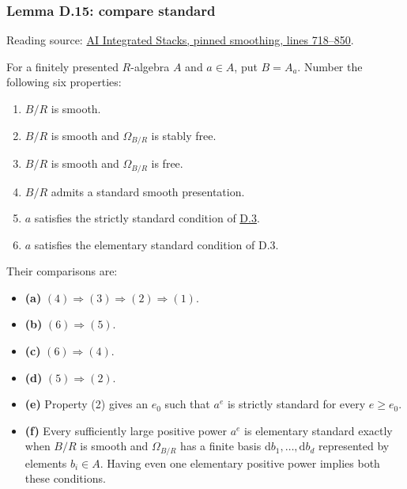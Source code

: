 \documentclass[11pt,a4paper,openany]{report}
\providecommand{\tightlist}{\setlength{\itemsep}{0pt}\setlength{\parskip}{0pt}}
\begin{document}
\label{AG-RG-S05-smoothing-lemma-compare-standard}

\subsubsection{Lemma D.15: compare standard}\label{AG-RG-S05-lemma-d.15-compare-standard}

Reading source: \href{https://github.com/KokunoYumeto/unofficial-stacks-project-ai-drafts/blob/565b10e987aba5969b21145a0833f42d69f96790/smoothing.tex\#L718-L850}{AI Integrated Stacks, pinned smoothing, lines 718--850}.

For a finitely presented \(R\)-algebra \(A\) and \(a\in A\), put \(B=A_a\). Number the following six properties:

\begin{enumerate}
\def\labelenumi{\arabic{enumi}.}
\tightlist
\item
  \(B/R\) is smooth.
\item
  \(B/R\) is smooth and \(\Omega_{B/R}\) is stably free.
\item
  \(B/R\) is smooth and \(\Omega_{B/R}\) is free.
\item
  \(B/R\) admits a standard smooth presentation.
\item
  \(a\) satisfies the strictly standard condition of \hyperref[AG-RG-S05-smoothing-definition-strictly-standard]{D.3}.
\item
  \(a\) satisfies the elementary standard condition of D.3.
\end{enumerate}

Their comparisons are:

\begin{itemize}
\tightlist
\item
  \textbf{(a)} \((4)\Rightarrow(3)\Rightarrow(2)\Rightarrow(1)\).
\item
  \textbf{(b)} \((6)\Rightarrow(5)\).
\item
  \textbf{(c)} \((6)\Rightarrow(4)\).
\item
  \textbf{(d)} \((5)\Rightarrow(2)\).
\item
  \textbf{(e)} Property (2) gives an \(e_0\) such that \(a^e\) is strictly standard for every \(e\geq e_0\).
\item
  \textbf{(f)} Every sufficiently large positive power \(a^e\) is elementary standard exactly when \(B/R\) is smooth and \(\Omega_{B/R}\) has a finite basis \(\mathrm db_1,\ldots,\mathrm db_d\) represented by elements \(b_i\in A\). Having even one elementary positive power implies both these conditions.
\end{itemize}
\end{document}
